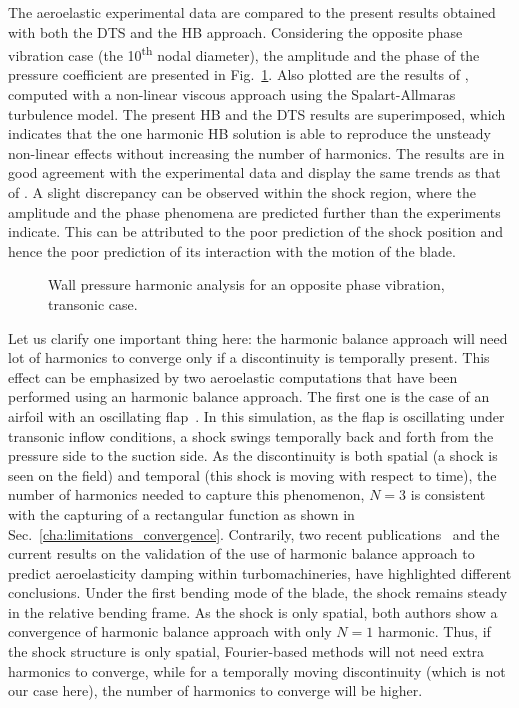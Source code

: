The aeroelastic experimental data are compared to the present results
obtained with both the DTS and the HB approach.  
Considering the opposite phase vibration case (the 10\textsuperscript{th} nodal diameter), 
the amplitude and the
phase of the pressure coefficient are presented in
Fig.~\ref{fig:stcf11_ael_transonic_ibpa_180_paper}. Also plotted are the results of
\citet{Cinnella2004}, computed with a non-linear viscous
approach using the Spalart-Allmaras turbulence model. The present HB and the DTS
results are superimposed, which indicates that the one harmonic HB solution is able
to reproduce the unsteady non-linear effects without increasing the
number of harmonics. The results are in good agreement with
the experimental data and display the same trends as that of
\citet{Cinnella2004}. A slight discrepancy can be observed within the shock
region, where the amplitude and the phase phenomena are predicted
further than the experiments indicate.  This can be attributed to the poor
prediction of the shock position and hence the poor prediction
of its interaction with the motion of the blade.
\begin{figure}[htp]
  \centering
  \caption{Wall pressure harmonic analysis for an opposite phase vibration, transonic case.}
  \label{fig:stcf11_ael_transonic_ibpa_180_paper}
\end{figure}

Let us clarify one important thing here: the harmonic balance approach
will need lot of harmonics to converge only 
if a discontinuity is temporally
present.
This effect can be emphasized by two 
aeroelastic computations that have been performed 
using an harmonic balance approach. 
The first one is the case of 
an airfoil with an oscillating 
flap~\cite{JDufour2009}. In this simulation, as the flap is oscillating
under transonic inflow conditions, a shock swings temporally
back and forth from the pressure side to the
suction side. As the discontinuity is
both spatial (a shock is seen on the field) and temporal
(this shock is moving with respect to time), the number
of harmonics needed to capture this phenomenon, $N=3$ is
consistent with the capturing of a rectangular function
as shown in Sec.~\ref{cha:limitations_convergence}.
Contrarily, two recent publications~\cite{Huang2013a} and the
current results on the validation
of the use of harmonic balance approach to predict
aeroelasticity damping within turbomachineries, have highlighted
different conclusions. Under the first bending mode
of the blade, the shock remains steady in the relative bending frame. As the shock
is only spatial, both authors show a convergence of 
harmonic balance approach with only $N=1$ harmonic. Thus, if the shock
structure is only spatial, Fourier-based methods will not need
extra harmonics to converge, while for a temporally moving discontinuity
(which is not our case here), the number
of harmonics to converge will be higher.

